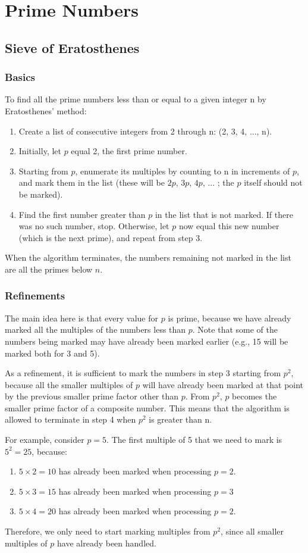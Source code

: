 \section{Prime Numbers}
\subsection{Sieve of Eratosthenes}
\subsubsection{Basics}
To find all the prime numbers less than or equal to a given integer n by Eratosthenes' method:
\begin{enumerate}
\item Create a   list of consecutive integers from 2 through n: (2, 3, 4, ..., n).
\item Initially, let $p$ equal 2, the first prime number.
\item Starting from $p$, enumerate its multiples by counting to n in increments of  $p$, and mark them in the list (these will be $2p$, $3p$, $4p$, ... ; the $p$ itself should not be marked).
\item Find the first number greater than $p$ in the list that is not marked. If there was no such number, stop. Otherwise, let $p$ now equal this new number (which is the next prime), and repeat from step 3.
\end{enumerate}

When the algorithm terminates, the numbers remaining not marked in the list are all the primes below $n$.

\subsubsection{Refinements}
The main idea here is that every value for $p$ is prime, because we have already marked all the multiples of the numbers less than $p$. Note that some of the numbers being marked may have already been marked earlier (e.g., 15 will be marked both for 3 and 5).

As a refinement, it is sufficient to mark the numbers in step 3 starting from $p^2$, because all the smaller multiples of $p$ will have already been marked at that point by the previous smaller prime factor other than $p$. From $p^2$, $p$ becomes the smaller prime factor of a composite number. This means that the algorithm is allowed to terminate in step 4 when $p^2$ is greater than n.

For example, consider $p=5$. The first multiple of 5 that we need to mark is $5^2 = 25$, because: 
\begin{enumerate}
\item $5 \times 2 = 10$ has already been marked when processing $p = 2$.
\item $5 \times 3 = 15$ has already been marked when processing $p = 3$ 
\item $5 \times 4 = 20$ has already been marked when processing $p = 2$. 
\end{enumerate}
Therefore, we only need to start marking multiples from $p^2$, since all smaller multiples of $p$ have already been handled.

